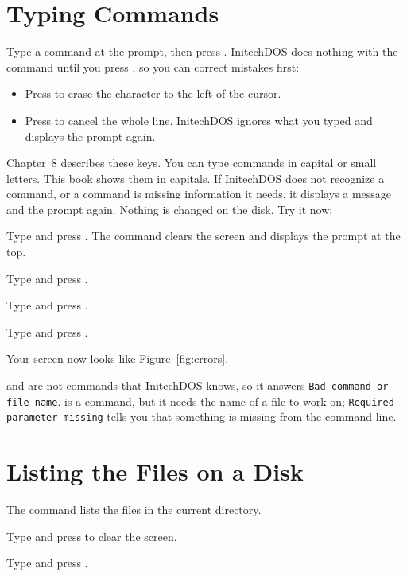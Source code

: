 \section{Typing Commands}
Type a command at the prompt, then press .  InitechDOS does
nothing with the command until you press , so you can correct
mistakes first:
\begin{itemize}
\item Press  to erase the character to the left of the
  cursor.
\item Press  to cancel the whole line.  InitechDOS ignores what
  you typed and displays the prompt again.
\end{itemize}
Chapter~8 describes these keys.  You can type commands in capital or small
letters.  This book shows them in capitals.  If InitechDOS does not
recognize a command, or a command is missing information it needs, it
displays a message and the prompt again.  Nothing is changed on the disk.
Try it now:
\begin{Steps}
\item Type  and press .  The %
   command clears the screen and displays the prompt
  at the top.
\item Type  and press .
\item Type  and press .
\item Type  and press .
\end{Steps}
Your screen now looks like Figure~\ref{fig:errors}.


 and  are not commands that InitechDOS knows, so it
answers \texttt{Bad command or file name}.   is a command, but it
needs the name of a file to work on; \texttt{Required parameter missing}
tells you that something is missing from the command line.

\section{Listing the Files on a Disk}
The  command lists the files in the current directory.
\begin{Steps}
\item Type  and press  to clear the screen.
\item Type  and press .
\end{Steps}

